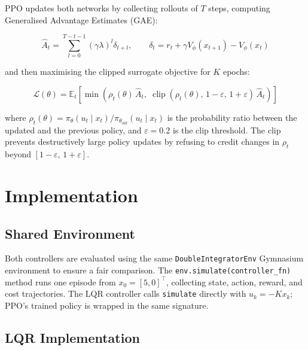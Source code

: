 \documentclass[11pt, a4paper]{article}
\newcommand{\E}{\mathbb{E}}
\newcommand{\T}{^\top}
\begin{document}
PPO updates both networks by collecting rollouts of $T$ steps, computing
Generalised Advantage Estimates (GAE):

\begin{equation}
  \hat{A}_t = \sum_{l=0}^{T-t-1} (\gamma\lambda)^l \delta_{t+l},
  \qquad
  \delta_t = r_t + \gamma V_\phi(x_{t+1}) - V_\phi(x_t)
  \label{eq:gae}
\end{equation}

and then maximising the clipped surrogate objective for $K$ epochs:

\begin{equation}
  \mathcal{L}(\theta) =
  \E_t\!\left[
    \min\!\left(
      \rho_t(\theta)\,\hat{A}_t,\;
      \operatorname{clip}(\rho_t(\theta),\,1-\varepsilon,\,1+\varepsilon)\,\hat{A}_t
    \right)
  \right]
  \label{eq:ppo}
\end{equation}

where $\rho_t(\theta) = \pi_\theta(u_t\mid x_t)/\pi_{\theta_{\text{old}}}(u_t\mid x_t)$
is the probability ratio between the updated and the previous policy, and
$\varepsilon = 0.2$ is the clip threshold. The clip prevents destructively
large policy updates by refusing to credit changes in $\rho_t$ beyond
$[1-\varepsilon,\, 1+\varepsilon]$.

\section{Implementation}

\subsection{Shared Environment}

Both controllers are evaluated using the same \texttt{DoubleIntegratorEnv}
Gymnasium environment to ensure a fair comparison. The
\texttt{env.simulate(controller\_fn)} method runs one episode from
$x_0 = [5, 0]\T$, collecting state, action, reward, and cost trajectories.
The LQR controller calls \texttt{simulate} directly with $u_k = -Kx_k$;
PPO's trained policy is wrapped in the same signature.

\subsection{LQR Implementation}
\end{document}
